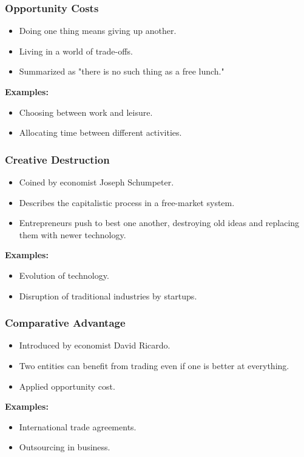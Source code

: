 \begin{frame}[fragile]\frametitle{Opportunity Costs}
\begin{itemize}
    \item Doing one thing means giving up another.
    \item Living in a world of trade-offs.
    \item Summarized as "there is no such thing as a free lunch."
\end{itemize}
\textbf{Examples:}
\begin{itemize}
    \item Choosing between work and leisure.
    \item Allocating time between different activities.
\end{itemize}
\end{frame}

\begin{frame}[fragile]\frametitle{Creative Destruction}
\begin{itemize}
    \item Coined by economist Joseph Schumpeter.
    \item Describes the capitalistic process in a free-market system.
    \item Entrepreneurs push to best one another, destroying old ideas and replacing them with newer technology.
\end{itemize}
\textbf{Examples:}
\begin{itemize}
    \item Evolution of technology.
    \item Disruption of traditional industries by startups.
\end{itemize}
\end{frame}

\begin{frame}[fragile]\frametitle{Comparative Advantage}
\begin{itemize}
    \item Introduced by economist David Ricardo.
    \item Two entities can benefit from trading even if one is better at everything.
    \item Applied opportunity cost.
\end{itemize}
\textbf{Examples:}
\begin{itemize}
    \item International trade agreements.
    \item Outsourcing in business.
\end{itemize}
\end{frame}

